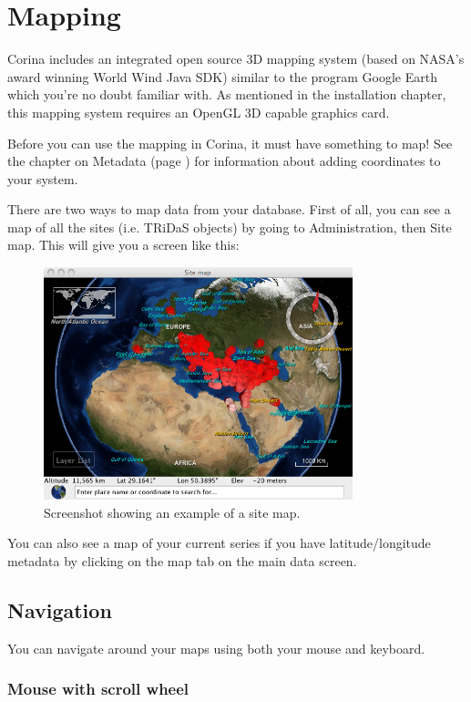 \chapter{Mapping}
Corina includes an integrated open source 3D mapping system (based on NASA's award winning World Wind Java SDK) similar to the program Google Earth which you're no doubt familiar with. As mentioned in the installation chapter, this mapping system requires an OpenGL 3D capable graphics card. 

Before you can use the mapping in Corina, it must have something to map! See the chapter on Metadata (page \pageref{txt:metadata}) for information about adding coordinates to your system.

There are two ways to map data from your database. First of all, you can see a map of all the sites (i.e. TRiDaS objects) by going to Administration, then Site map. This will give you a screen like this:

\begin{figure}[hbtp]
  \caption{Screenshot showing an example of a site map.}
  \label{fig:map}
  \centering
    \includegraphics[width=0.8\textwidth]{Images/sitemap.png}
\end{figure}


You can also see a map of your current series if you have latitude/longitude metadata by clicking on the map tab on the main data screen. 

\section{Navigation}
You can navigate around your maps using both your mouse and keyboard.

\subsection{Mouse with scroll wheel}

